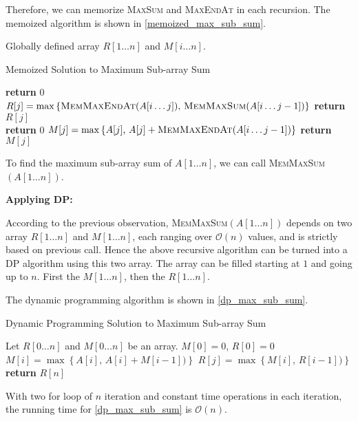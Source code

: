 \begin{homeworkProblem}
Therefore, we can memorize \textsc{MaxSum} and \textsc{MaxEndAt} in each recursion.
The memoized algorithm is shown in \cref{memoized_max_sub_sum}.

Globally defined array $R[1 \ldots n]$ and $M[i \ldots n]$.

\begin{algorithm}[H]
    \caption{Memoized Solution to Maximum Sub-array Sum}\label{memoized_max_sub_sum}
    \begin{algorithmic}[1]
                \State \textbf{return } $0$
            \EndIf
            \State $R[j] = \max\left\{\text{\textsc{MemMaxEndAt}}(A[i\ldots j])\text{,\ }\text{\textsc{MemMaxSum}}(A[i\ldots j-1])\right\}$
            \EndIf
            \State \textbf{return } $R[j]$
        \EndProcedure
        \\\hrulefill
                \State \textbf{return } $0$
            \EndIf
            \State $M[j] = \max\left\{A[j]\text{,\ }A[j] + \text{\textsc{MemMaxEndAt}}(A[i\ldots j-1])\right\}$
            \EndIf
            \State \textbf{return } $M[j]$
        \EndProcedure
    \end{algorithmic}
\end{algorithm}

To find the maximum sub-array sum of $A[1\ldots n]$, we can call \textsc{MemMaxSum}$(A[1\ldots n])$.

\pagebreak
\noindent
\textbf{Applying DP:\ }

According to the previous observation, \textsc{MemMaxSum}$(A[1\ldots n])$ depends on two array 
$R[1\ldots n]$ and $M[1\ldots n]$, each ranging over $\mathcal{O}(n)$ values, and is strictly
based on previous call. Hence the above recursive algorithm can be turned into a DP
algorithm using this two array. The array can be filled starting at $1$ and going up to $n$.
First the $M[1\ldots n]$, then the $R[1\dots n]$.

The dynamic programming algorithm is shown in \cref{dp_max_sub_sum}.

\begin{algorithm}[H]
    \caption{Dynamic Programming Solution to Maximum Sub-array Sum}\label{dp_max_sub_sum}
    \begin{algorithmic}[1]
            \State Let $R[0\ldots n]$ and $M[0\ldots n]$ be an array.
            \State $M[0] = 0$, $R[0] = 0$
                \State $M[i] = \max\left\{A[i]\text{,\ }A[i] + M[i-1])\right\}$
            \EndFor
                \State $R[j] = \max\left\{M[i]\text{,\ }R[i-1])\right\}$
            \EndFor
            \State \textbf{return }$R[n]$
        \EndProcedure
    \end{algorithmic}
\end{algorithm}

With two for loop of $n$ iteration and constant time operations in each iteration, the running time for \cref{dp_max_sub_sum} is $\mathcal{O}(n)$.

\end{homeworkProblem}
